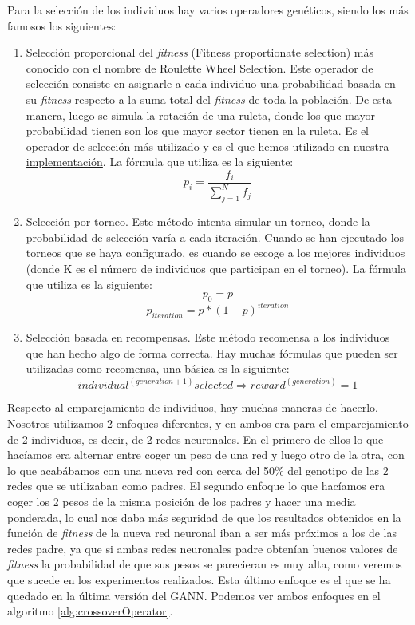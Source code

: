 Para la selección de los individuos hay varios operadores genéticos, siendo los más famosos los siguientes:

\begin{enumerate}
    \item Selección proporcional del \textit{fitness} (Fitness proportionate selection) más conocido con el nombre de Roulette Wheel Selection. Este operador de selección consiste en asignarle a cada individuo una probabilidad basada en su \textit{fitness} respecto a la suma total del \textit{fitness} de toda la población. De esta manera, luego se simula la rotación de una ruleta, donde los que mayor probabilidad tienen son los que mayor sector tienen en la ruleta. Es el operador de selección más utilizado y \underline{es el que hemos utilizado en nuestra implementación}. La fórmula que utiliza es la siguiente:
    \[p_{i}=\dfrac{f_{i}}{\sum_{j=1}^{N}{f_{j}}}\]
    \item Selección por torneo. Este método intenta simular un torneo, donde la probabilidad de selección varía a cada iteración. Cuando se han ejecutado los torneos que se haya configurado, es cuando se escoge a los mejores individuos (donde K es el número de individuos que participan en el torneo). La fórmula que utiliza es la siguiente:
    \[p_{0}=p\]
    \[p_{iteration}=p*(1-p)^{iteration}\]
    \item Selección basada en recompensas. Este método recomensa a los individuos que han hecho algo de forma correcta. Hay muchas fórmulas que pueden ser utilizadas como recomensa, una básica es la siguiente:
    \[individual^{(generation + 1)} selected \Rightarrow reward^{(generation)} = 1\]
\end{enumerate}

Respecto al emparejamiento de individuos, hay muchas maneras de hacerlo. Nosotros utilizamos 2 enfoques diferentes, y en ambos era para el emparejamiento de 2 individuos, es decir, de 2 redes neuronales. En el primero de ellos lo que hacíamos era alternar entre coger un peso de una red y luego otro de la otra, con lo que acabábamos con una nueva red con cerca del 50\% del genotipo de las 2 redes que se utilizaban como padres. El segundo enfoque lo que hacíamos era coger los 2 pesos de la misma posición de los padres y hacer una media ponderada, lo cual nos daba más seguridad de que los resultados obtenidos en la función de \textit{fitness} de la nueva red neuronal iban a ser más próximos a los de las redes padre, ya que si ambas redes neuronales padre obtenían buenos valores de \textit{fitness} la probabilidad de que sus pesos se parecieran es muy alta, como veremos que sucede en los experimentos realizados. Esta último enfoque es el que se ha quedado en la última versión del GANN. Podemos ver ambos enfoques en el algoritmo \ref{alg:crossoverOperator}.

